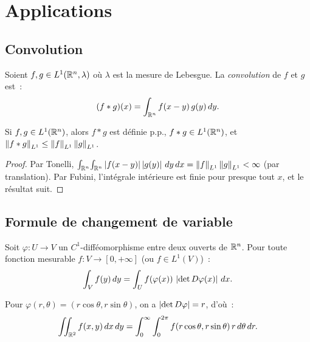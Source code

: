 \section{Applications}

\subsection{Convolution}

\begin{definition}[Convolution]
Soient $f, g \in L^1(\mathbb{R}^n, \lambda)$ o\`u $\lambda$ est la mesure de Lebesgue.
La \emph{convolution} de $f$ et $g$ est~:
\[
    (f * g)(x) = \int_{\mathbb{R}^n} f(x - y)\, g(y)\, dy.
\]
\end{definition}

\begin{proposition}
Si $f, g \in L^1(\mathbb{R}^n)$, alors $f * g$ est d\'efinie p.p., $f * g \in L^1(\mathbb{R}^n)$, et
$\left\| f * g \right\|_{L^1} \leq \left\| f \right\|_{L^1} \left\| g \right\|_{L^1}$.
\end{proposition}

\begin{proof}
Par Tonelli, $\int_{\mathbb{R}^n}\!\int_{\mathbb{R}^n} \left| f(x-y) \right| \left| g(y) \right|\, dy\, dx
= \left\| f \right\|_{L^1} \left\| g \right\|_{L^1} < \infty$ (par translation). Par Fubini,
l'int\'egrale int\'erieure est finie pour presque tout $x$, et le r\'esultat suit.
\end{proof}

\subsection{Formule de changement de variable}

\begin{theoreme}
Soit $\varphi : U \to V$ un $C^1$-diff\'eomorphisme entre deux ouverts de $\mathbb{R}^n$.
Pour toute fonction mesurable $f : V \to [0, +\infty]$ (ou $f \in L^1(V)$)~:
\[
    \int_V f(y)\, dy = \int_U f(\varphi(x))\, \left| \det D\varphi(x) \right|\, dx.
\]
\end{theoreme}

\begin{exemple}
Pour $\varphi(r, \theta) = (r\cos\theta, r\sin\theta)$, on a
$\left| \det D\varphi \right| = r$, d'o\`u~:
\[
    \iint_{\mathbb{R}^2} f(x,y)\, dx\, dy = \int_0^{\infty} \int_0^{2\pi} f(r\cos\theta, r\sin\theta)\, r\, d\theta\, dr.
\]
\end{exemple}

